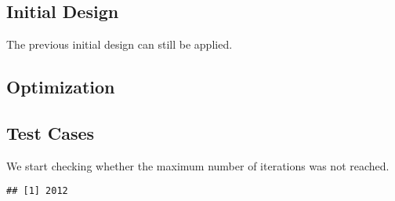 \documentclass[
]{book}
\newenvironment{Shaded}{\begin{snugshade}}{\end{snugshade}}
\newcommand{\DataTypeTok}[1]{\textcolor[rgb]{0.13,0.29,0.53}{#1}}
\newcommand{\DecValTok}[1]{\textcolor[rgb]{0.00,0.00,0.81}{#1}}
\newcommand{\KeywordTok}[1]{\textcolor[rgb]{0.13,0.29,0.53}{\textbf{#1}}}
\newcommand{\NormalTok}[1]{#1}
\newcommand{\OperatorTok}[1]{\textcolor[rgb]{0.81,0.36,0.00}{\textbf{#1}}}
\newcommand{\StringTok}[1]{\textcolor[rgb]{0.31,0.60,0.02}{#1}}
\begin{document}
\hypertarget{initial-design-4}{%
\subsection{Initial Design}\label{initial-design-4}}

The previous initial design can still be applied.

\hypertarget{optimization-5}{%
\subsection{Optimization}\label{optimization-5}}

\begin{Shaded}
\end{Shaded}

\hypertarget{test-cases-5}{%
\subsection{Test Cases}\label{test-cases-5}}

We start checking whether the maximum number of iterations was not reached.

\begin{Shaded}
\end{Shaded}

\begin{verbatim}
## [1] 2012
\end{verbatim}

\begin{Shaded}
\end{Shaded}
\end{document}

